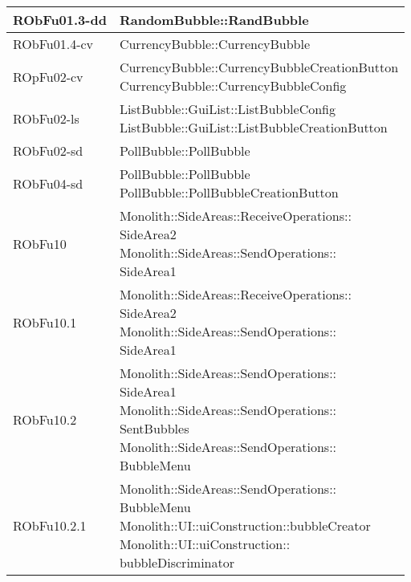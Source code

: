 \begin{center}
\begin{longtable}{|
*{1}{>{\centering\arraybackslash}m{2.5cm}|}
*{1}{>{\centering\arraybackslash}m{7.5cm}|}}
RObFu01.3-dd & \makecell[l]{RandomBubble::RandBubble
\\}\\\hline
RObFu01.4-cv & \makecell[l]{CurrencyBubble::CurrencyBubble
\\}\\\hline
ROpFu02-cv & \makecell[l]{CurrencyBubble::CurrencyBubbleCreationButton
\\CurrencyBubble::CurrencyBubbleConfig
\\}\\\hline
RObFu02-ls & \makecell[l]{ListBubble::GuiList::ListBubbleConfig
\\ListBubble::GuiList::ListBubbleCreationButton
\\}\\\hline
RObFu02-sd & \makecell[l]{PollBubble::PollBubble
\\}\\\hline
RObFu04-sd & \makecell[l]{PollBubble::PollBubble
\\PollBubble::PollBubbleCreationButton
\\}\\\hline
RObFu10 & \makecell[l]{Monolith::SideAreas::ReceiveOperations:: \\ \hfill SideArea2
\\Monolith::SideAreas::SendOperations:: \\ \hfill SideArea1
\\}\\\hline
RObFu10.1 & \makecell[l]{Monolith::SideAreas::ReceiveOperations:: \\ \hfill SideArea2
\\Monolith::SideAreas::SendOperations:: \\ \hfill SideArea1
\\}\\\hline
RObFu10.2 & \makecell[l]{Monolith::SideAreas::SendOperations:: \\ \hfill SideArea1
\\Monolith::SideAreas::SendOperations:: \\ \hfill SentBubbles
\\Monolith::SideAreas::SendOperations:: \\ \hfill BubbleMenu
\\}\\\hline
RObFu10.2.1 & \makecell[l]{Monolith::SideAreas::SendOperations:: \\ \hfill BubbleMenu
\\Monolith::UI::uiConstruction::bubbleCreator
\\Monolith::UI::uiConstruction:: \\ \hfill bubbleDiscriminator
}
\end{longtable}
\end{center}
